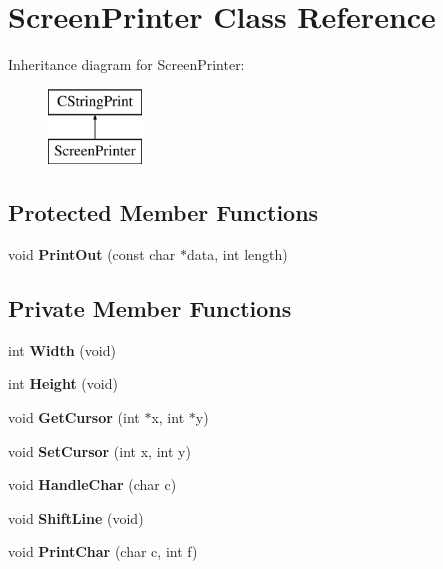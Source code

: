 \hypertarget{class_screen_printer}{}\section{Screen\+Printer Class Reference}
\label{class_screen_printer}
Inheritance diagram for Screen\+Printer\+:\begin{figure}[H]
\begin{center}
\leavevmode
\includegraphics[height=2.000000cm]{class_screen_printer}
\end{center}
\end{figure}
\subsection*{Protected Member Functions}
\begin{DoxyCompactItemize}
\item 
\mbox{\label{class_screen_printer_a9610331aaa93a9456672aa5d19383e78}} 
void {\bfseries Print\+Out} (const char $\ast$data, int length)
\end{DoxyCompactItemize}
\subsection*{Private Member Functions}
\begin{DoxyCompactItemize}
\item 
\mbox{\label{class_screen_printer_a614cc695bdda8114739646ec4dbfb149}} 
int {\bfseries Width} (void)
\item 
\mbox{\label{class_screen_printer_ada242aee697d49cc39f404b136255aa6}} 
int {\bfseries Height} (void)
\item 
\mbox{\label{class_screen_printer_adc59988b0f036db10f256e4899ab885d}} 
void {\bfseries Get\+Cursor} (int $\ast$x, int $\ast$y)
\item 
\mbox{\label{class_screen_printer_a78db6dfebf3a858324dc481da3f86244}} 
void {\bfseries Set\+Cursor} (int x, int y)
\item 
\mbox{\label{class_screen_printer_a91946ab6bc21675d72d65f1409fda09e}} 
void {\bfseries Handle\+Char} (char c)
\item 
\mbox{\label{class_screen_printer_ab43b2812f065247945d959ab1bbb2a7d}} 
void {\bfseries Shift\+Line} (void)
\item 
\mbox{\label{class_screen_printer_a6d40bd673b8ff1916dcbd436ba3ba35e}} 
void {\bfseries Print\+Char} (char c, int f)
\end{DoxyCompactItemize}
